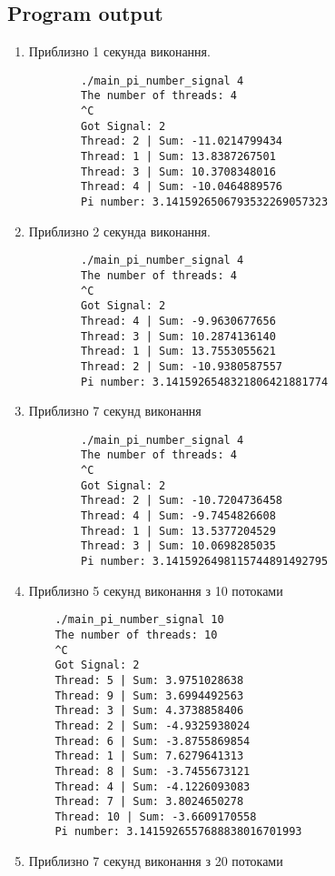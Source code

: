 \documentclass{article}
\begin{document}
\subsection{Program output}
\begin{enumerate}
	\normalsize
	\item Приблизно 1 секунда виконання.\vspace{-3mm}
	\begin{verbatim}
		./main_pi_number_signal 4
		The number of threads: 4
		^C
		Got Signal: 2
		Thread: 2 | Sum: -11.0214799434
		Thread: 1 | Sum: 13.8387267501
		Thread: 3 | Sum: 10.3708348016
		Thread: 4 | Sum: -10.0464889576
		Pi number: 3.1415926506793532269057323
	\end{verbatim}
	\item Приблизно 2 секунда виконання.\vspace{-3mm}
	\begin{verbatim}
		./main_pi_number_signal 4
		The number of threads: 4
		^C
		Got Signal: 2
		Thread: 4 | Sum: -9.9630677656
		Thread: 3 | Sum: 10.2874136140
		Thread: 1 | Sum: 13.7553055621
		Thread: 2 | Sum: -10.9380587557
		Pi number: 3.1415926548321806421881774
	\end{verbatim}
	\item Приблизно 7 секунд виконання\vspace{-3mm}
	\begin{verbatim}
		./main_pi_number_signal 4
		The number of threads: 4
		^C
		Got Signal: 2
		Thread: 2 | Sum: -10.7204736458
		Thread: 4 | Sum: -9.7454826608
		Thread: 1 | Sum: 13.5377204529
		Thread: 3 | Sum: 10.0698285035
		Pi number: 3.1415926498115744891492795
	\end{verbatim} 
	\item Приблизно 5 секунд виконання з 10 потоками\vspace{-3mm}
	\begin{verbatim}
	./main_pi_number_signal 10
	The number of threads: 10
	^C
	Got Signal: 2
	Thread: 5 | Sum: 3.9751028638
	Thread: 9 | Sum: 3.6994492563
	Thread: 3 | Sum: 4.3738858406
	Thread: 2 | Sum: -4.9325938024
	Thread: 6 | Sum: -3.8755869854
	Thread: 1 | Sum: 7.6279641313
	Thread: 8 | Sum: -3.7455673121
	Thread: 4 | Sum: -4.1226093083
	Thread: 7 | Sum: 3.8024650278
	Thread: 10 | Sum: -3.6609170558
	Pi number: 3.1415926557688838016701993
	\end{verbatim} 
	\item Приблизно 7 секунд виконання з 20 потоками\vspace{-3mm}
	\begin{verbatim}

\end{verbatim}
\end{enumerate}
\end{document}
